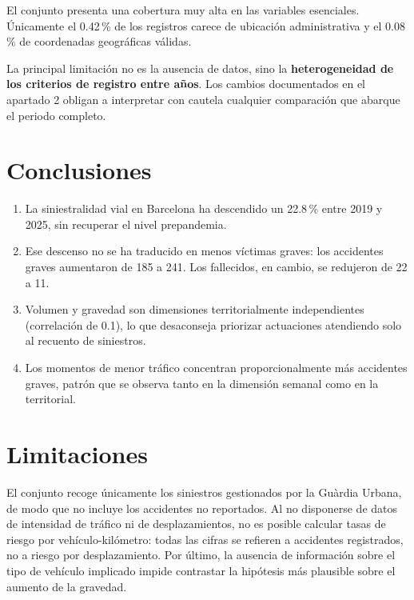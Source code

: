 \documentclass[11pt,a4paper]{article}\usepackage[]{graphicx}\usepackage[]{xcolor}
\begin{document}
El conjunto presenta una cobertura muy alta en las variables esenciales.
Únicamente el
0.42\,\% de los
registros carece de ubicación administrativa y el
0.08\,\% de
coordenadas geográficas válidas.

La principal limitación no es la ausencia de datos, sino la
\textbf{heterogeneidad de los criterios de registro entre años}. Los
cambios documentados en el apartado 2 obligan a interpretar con cautela
cualquier comparación que abarque el periodo completo.

\section{Conclusiones}

\begin{enumerate}
  \item La siniestralidad vial en Barcelona ha descendido un
        22.8\,\% entre 2019 y 2025, sin
        recuperar el nivel prepandemia.
  \item Ese descenso no se ha traducido en menos víctimas graves: los
        accidentes graves aumentaron de 185 a
        241. Los fallecidos, en cambio, se redujeron de
        22 a 11.
  \item Volumen y gravedad son dimensiones territorialmente
        independientes (correlación de 0.1), lo
        que desaconseja priorizar actuaciones atendiendo solo al recuento
        de siniestros.
  \item Los momentos de menor tráfico concentran proporcionalmente más
        accidentes graves, patrón que se observa tanto en la dimensión
        semanal como en la territorial.
\end{enumerate}

\section*{Limitaciones}

El conjunto recoge únicamente los siniestros gestionados por la Guàrdia
Urbana, de modo que no incluye los accidentes no reportados. Al no
disponerse de datos de intensidad de tráfico ni de desplazamientos, no es
posible calcular tasas de riesgo por vehículo-kilómetro: todas las cifras
se refieren a accidentes registrados, no a riesgo por desplazamiento. Por
último, la ausencia de información sobre el tipo de vehículo implicado
impide contrastar la hipótesis más plausible sobre el aumento de la
gravedad.
\end{document}
